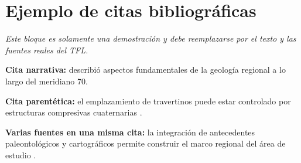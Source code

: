 \section{Ejemplo de citas bibliográficas}

\textit{Este bloque es solamente una demostración y debe reemplazarse por el
texto y las fuentes reales del TFL.}

\textbf{Cita narrativa:} \textcite{groeber1946} describió aspectos
fundamentales de la geología regional a lo largo del meridiano 70.

\textbf{Cita parentética:} el emplazamiento de travertinos puede estar
controlado por estructuras compresivas cuaternarias
\parencite{alcacersanchez2020}.

\textbf{Varias fuentes en una misma cita:} la integración de antecedentes
paleontológicos y cartográficos permite construir el marco regional del área
de estudio \parencite{weaver1931,ramos1981}.
